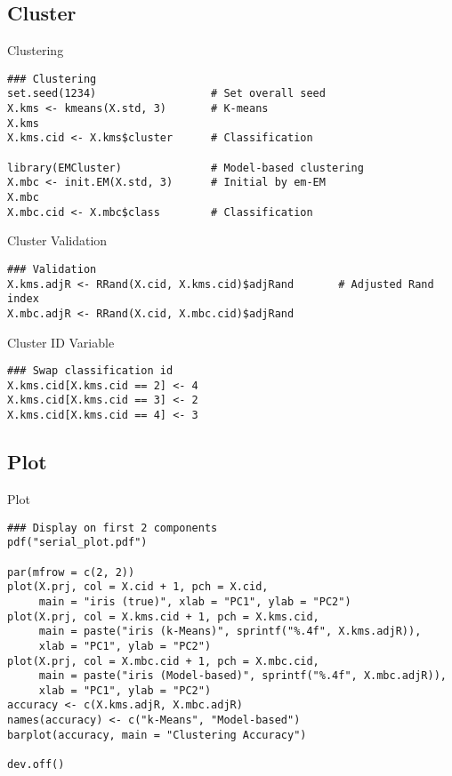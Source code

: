\subsection{Cluster}

\begin{frame}[fragile]
  \begin{block}{Clustering}\pause
\begin{lstlisting}
### Clustering
set.seed(1234)                  # Set overall seed
X.kms <- kmeans(X.std, 3)       # K-means
X.kms
X.kms.cid <- X.kms$cluster      # Classification

library(EMCluster)              # Model-based clustering
X.mbc <- init.EM(X.std, 3)      # Initial by em-EM
X.mbc
X.mbc.cid <- X.mbc$class        # Classification
\end{lstlisting}
\end{block}
\end{frame}

\begin{frame}[fragile]
  \begin{block}{Cluster Validation}\pause
\begin{lstlisting}
### Validation
X.kms.adjR <- RRand(X.cid, X.kms.cid)$adjRand       # Adjusted Rand index
X.mbc.adjR <- RRand(X.cid, X.mbc.cid)$adjRand
\end{lstlisting}
\end{block}
\end{frame}

\begin{frame}[fragile]
  \begin{block}{Cluster ID Variable}\pause
\begin{lstlisting}
### Swap classification id
X.kms.cid[X.kms.cid == 2] <- 4
X.kms.cid[X.kms.cid == 3] <- 2
X.kms.cid[X.kms.cid == 4] <- 3
\end{lstlisting}
\end{block}
\end{frame}

\subsection{Plot}

\begin{frame}[fragile]
  \begin{block}{Plot}\pause
\begin{lstlisting}
### Display on first 2 components
pdf("serial_plot.pdf")

par(mfrow = c(2, 2))
plot(X.prj, col = X.cid + 1, pch = X.cid,
     main = "iris (true)", xlab = "PC1", ylab = "PC2")
plot(X.prj, col = X.kms.cid + 1, pch = X.kms.cid,
     main = paste("iris (k-Means)", sprintf("%.4f", X.kms.adjR)),
     xlab = "PC1", ylab = "PC2")
plot(X.prj, col = X.mbc.cid + 1, pch = X.mbc.cid,
     main = paste("iris (Model-based)", sprintf("%.4f", X.mbc.adjR)),
     xlab = "PC1", ylab = "PC2")
accuracy <- c(X.kms.adjR, X.mbc.adjR)
names(accuracy) <- c("k-Means", "Model-based")
barplot(accuracy, main = "Clustering Accuracy")

dev.off()
\end{lstlisting}
\end{block}
\end{frame}


